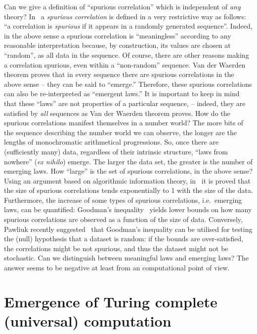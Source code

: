 \documentclass[12pt]{article}
\begin{document}
Can we give a definition of ``spurious correlation'' which is independent of {\it any} theory? In~\cite{suprious2016} a
{\it spurious correlation} is defined in a very restrictive way as follows:
``a correlation is {\it spurious} if it appears in a randomly generated sequence''.
Indeed, in the above sense a spurious correlation
is ``meaningless'' according to any reasonable interpretation  because, by construction, its values are chosen at ``random'', as
all data in the sequence.
Of course, there are other reasons making a correlation spurious, even within a ``non-random'' sequence.
Van der Waerden theorem proves that in every sequence there are spurious correlations in the above sense --
they
can be said to ``emerge.''
Therefore, these spurious correlations can also be re-interpreted as ``emergent laws.''
It is important to keep in mind that these ``laws'' are not properties of a particular sequence,
-- indeed, they are satisfied by {\em all} sequences as Van der Waerden theorem proves.
How do the spurious correlations manifest themselves in a number world? The more bits of the sequence describing the
number world we can observe, the longer are the lengths of monochromatic arithmetical progressions.
So, once there are (sufficiently many) data, regardless of their intrinsic structure, ``laws from nowhere''
({\it ex nihilo}) emerge.
The larger the data set, the greater is the number of emerging laws. How ``large'' is the set of spurious correlations, in
the above sense? Using an argument based on algorithmic information theory, in~\cite{suprious2016} it is proved that
the size of spurious correlations tends exponentially to 1 with the size of the data.
Furthermore, the increase of some types of spurious correlations, i.e.~emerging laws, can be quantified:
Goodman's inequality~\cite{Goodman-1959,Schwenk-1972} yields lower bounds on how
many spurious correlations are observed as a function of the size of data.
Conversely, Pawliuk recently suggested~\cite{Pawliuk-2017} that Goodman's inequality can be
utilised for testing the (null) hypothesis that a dataset is random:
if the bounds are over-satisfied,
the correlations might be not
spurious, and thus the dataset might not be stochastic.
Can we distinguish between meaningful laws and emerging laws? The answer seems to be negative at least from an
computational point of view.







\section{Emergence of Turing complete (universal) computation}
\label{2018-was-sectcfcs}
\end{document}
